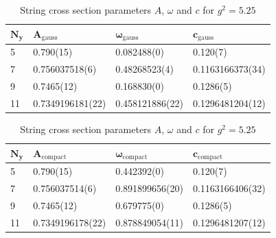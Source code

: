 \begin{table}[!hb]
\centering
\begin{tabular}{llll}
    $\mathbf{N_y}$ & $\mathbf{A_\mathrm{gauss}}$ & $\mathbf{\omega_\mathrm{gauss}}$ & $\mathbf{c_\mathrm{gauss}}$ \\ \hline
   5 & 0.790(15) & 0.082488(0) & 0.120(7) \\
   7 & 0.756037518(6) & 0.48268523(4) & 0.1163166373(34) \\
   9 & 0.7465(12) & 0.168830(0) & 0.1286(5) \\
   11 & 0.7349196181(22) & 0.458121886(22) & 0.1296481204(12) \\
\end{tabular}
\begin{tabular}{llll}
    $\mathbf{N_y}$ & $\mathbf{A_\mathrm{compact}}$ & $\mathbf{\omega_\mathrm{compact}}$ & $\mathbf{c_\mathrm{compact}}$ \\ \hline
   5 & 0.790(15) & 0.442392(0) & 0.120(7) \\
   7 & 0.756037514(6) & 0.891899656(20) & 0.1163166406(32) \\
   9 & 0.7465(12) & 0.679775(0) & 0.1286(5) \\
   11 & 0.7349196178(22) & 0.878849054(11) & 0.1296481207(12) \\
\end{tabular}
\caption{String cross section parameters $A$, $\omega$ and $c$ for $g^2=5.25$}
\end{table}
